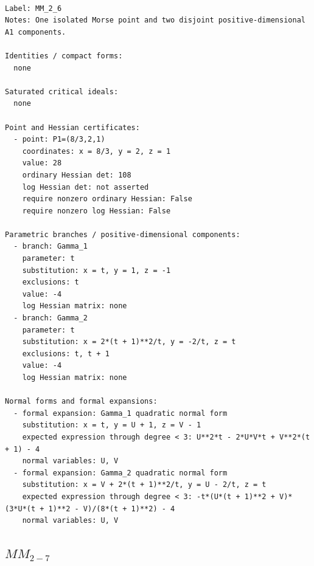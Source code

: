 \documentclass[10pt,a4paper]{article}
\begin{document}
\begin{lstlisting}

Label: MM_2_6
Notes: One isolated Morse point and two disjoint positive-dimensional A1 components.

Identities / compact forms:
  none

Saturated critical ideals:
  none

Point and Hessian certificates:
  - point: P1=(8/3,2,1)
    coordinates: x = 8/3, y = 2, z = 1
    value: 28
    ordinary Hessian det: 108
    log Hessian det: not asserted
    require nonzero ordinary Hessian: False
    require nonzero log Hessian: False

Parametric branches / positive-dimensional components:
  - branch: Gamma_1
    parameter: t
    substitution: x = t, y = 1, z = -1
    exclusions: t
    value: -4
    log Hessian matrix: none
  - branch: Gamma_2
    parameter: t
    substitution: x = 2*(t + 1)**2/t, y = -2/t, z = t
    exclusions: t, t + 1
    value: -4
    log Hessian matrix: none

Normal forms and formal expansions:
  - formal expansion: Gamma_1 quadratic normal form
    substitution: x = t, y = U + 1, z = V - 1
    expected expression through degree < 3: U**2*t - 2*U*V*t + V**2*(t + 1) - 4
    normal variables: U, V
  - formal expansion: Gamma_2 quadratic normal form
    substitution: x = V + 2*(t + 1)**2/t, y = U - 2/t, z = t
    expected expression through degree < 3: -t*(U*(t + 1)**2 + V)*(3*U*(t + 1)**2 - V)/(8*(t + 1)**2) - 4
    normal variables: U, V

\end{lstlisting}

\subsection*{$ MM_{2-7} $}
\end{document}
